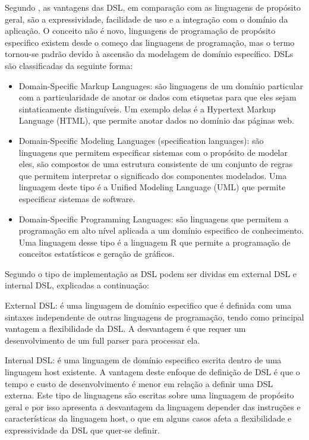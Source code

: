 Segundo \citet{Mernik:2005:DDL:1118890.1118892}, as vantagens das
DSL, em comparação com as linguagens de propósito geral, são a expressividade,
facilidade de uso e a integração com o domínio da aplicação. O conceito
não é novo, linguagens de programação de propósito especifico existem
desde o começo das linguagens de programação, mas o termo tornou-se
padrão devido à ascensão da modelagem de domínio específico. DSLs
são classificadas da seguinte forma:
%
\begin{itemize}
\item Domain-Specific Markup Languages\foreignlanguage{brazil}{: são linguagens
de um domínio particular com a particularidade de anotar os dados
com etiquetas para que eles sejam sintaticamente distinguíveis. Um
exemplo delas é a }Hypertext Markup Language (HTML),\foreignlanguage{brazil}{
que permite anotar dados no domínio das páginas web.}
\item Domain-Specific Modeling Languages (specification languages):\foreignlanguage{brazil}{
são linguagens que permitem especificar sistemas com o propósito de
modelar eles, são compostos de uma estrutura consistente de um conjunto
de regras que permitem interpretar o significado dos componentes modelados.
Uma linguagem deste tipo é a }Unified Modeling Language\foreignlanguage{brazil}{
(}UML\foreignlanguage{brazil}{)
que permite especificar sistemas de software.}
\item Domain-Specific Programming Languages:\foreignlanguage{brazil}{ são
linguagens que permitem a programação em alto nível aplicada a um
domínio especifico de conhecimento. Uma linguagem desse tipo é a linguagem
R que permite a programação de conceitos estatísticos e geração de
gráficos.}
\end{itemize}
%

Segundo o tipo de implementação as DSL podem ser dividas em \foreignlanguage{english}{external
DSL e internal DSL,} explicadas a continuação\citep{fowler2010domain}:

%
External DSL:\foreignlanguage{brazil}{ é uma linguagem de domínio
especifico que é definida com uma sintaxes independente de outras
linguagens de programação, tendo como principal vantagem a flexibilidade
da DSL. A desvantagem é que requer um desenvolvimento de um }full\foreignlanguage{brazil}{
parser para processar ela.}

Internal DSL:\foreignlanguage{brazil}{ é uma linguagem de domínio
especifico escrita dentro de uma linguagem }host\foreignlanguage{brazil}{
existente. A vantagem deste enfoque de definição de DSL é que o tempo
e custo de desenvolvimento é menor em relação a definir uma DSL externa.
Este tipo de linguagens são escritas sobre uma linguagem de propósito
geral e por isso apresenta a desvantagem da linguagem depender das
instruções e características da linguagem }host,\foreignlanguage{brazil}{
o que em alguns casos afeta a flexibilidade e expressividade da DSL
que quer-se definir.}
%

